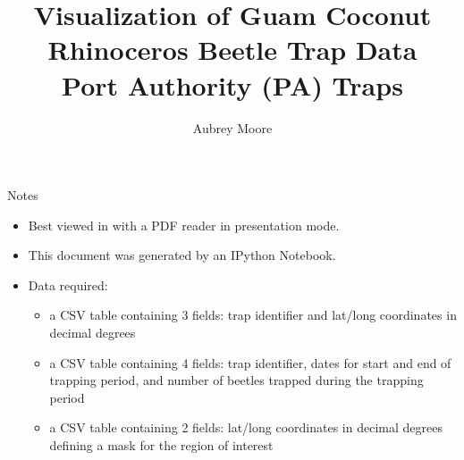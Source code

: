 \documentclass{beamer}
\title{Visualization of Guam Coconut Rhinoceros Beetle Trap Data\\Port Authority (PA) Traps}
\author{Aubrey Moore}
\begin{document}
\frame{\titlepage}

\begin{frame}{Notes}
\begin{itemize}
    \item Best viewed in with a PDF reader in presentation mode.
    \item This document was generated by an IPython Notebook.
    \item Data required:
    \begin{itemize}
        \item a CSV table containing 3 fields: trap identifier and lat/long coordinates in decimal degrees
        \item a CSV table containing 4 fields: trap identifier, dates for start and end of trapping period, 
and number of beetles trapped during the trapping period
        \item a CSV table containing 2 fields: lat/long coordinates in decimal degrees defining a mask for the region of interest
    \end{itemize}
\end{itemize}
\end{frame}
\end{document}
